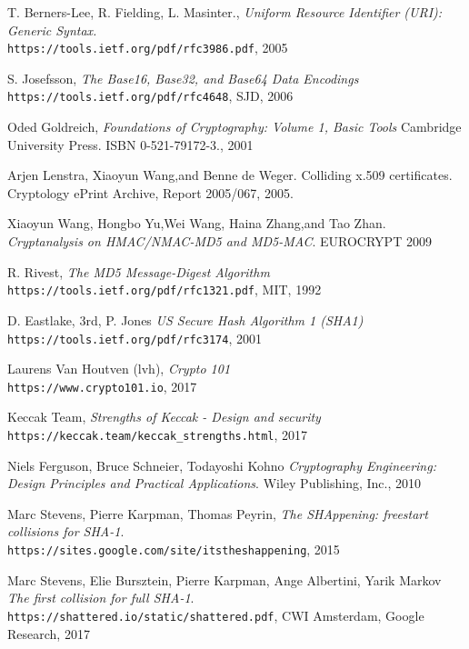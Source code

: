 \begin{thebibliography}{9}

T. Berners-Lee, R. Fielding, L. Masinter.,
\textit{Uniform Resource Identifier (URI): Generic Syntax.} \\ 
\texttt{https://tools.ietf.org/pdf/rfc3986.pdf}, 2005

S. Josefsson,
\textit{The Base16, Base32, and Base64 Data Encodings} \\ 
\texttt{https://tools.ietf.org/pdf/rfc4648}, SJD, 2006

Oded Goldreich,
\textit{Foundations of Cryptography: Volume 1, Basic Tools}  
Cambridge University Press. ISBN 0-521-79172-3., 2001

Arjen Lenstra, Xiaoyun Wang,and Benne de Weger. Colliding
x.509 certificates. Cryptology ePrint Archive, Report 2005/067,
2005.

Xiaoyun Wang, Hongbo Yu,Wei Wang, Haina Zhang,and Tao Zhan. 
\textit{Cryptanalysis on HMAC/NMAC-MD5 and MD5-MAC}. EUROCRYPT 2009

R. Rivest,
\textit{The MD5 Message-Digest Algorithm} \\ 
\texttt{https://tools.ietf.org/pdf/rfc1321.pdf}, MIT, 1992

D. Eastlake, 3rd, P. Jones
\textit{US Secure Hash Algorithm 1 (SHA1)} \\ 
\texttt{https://tools.ietf.org/pdf/rfc3174}, 2001

Laurens Van Houtven (lvh),
\textit{Crypto 101} \\ 
\texttt{https://www.crypto101.io}, 2017

Keccak Team,
\textit{Strengths of Keccak - Design and security} \\ 
\texttt{https://keccak.team/keccak\_strengths.html}, 2017

Niels Ferguson, Bruce Schneier, Todayoshi Kohno
\textit{Cryptography Engineering: Design Principles and Practical Applications}. Wiley Publishing, Inc., 2010

Marc Stevens, Pierre Karpman, Thomas Peyrin,
\textit{The SHAppening: freestart collisions for SHA-1}. \\
\texttt{https://sites.google.com/site/itstheshappening}, 2015

Marc Stevens, Elie Bursztein, Pierre Karpman, Ange Albertini, Yarik Markov
\textit{The first collision for full SHA-1}. \\
\texttt{https://shattered.io/static/shattered.pdf}, CWI Amsterdam, Google Research, 2017


\end{thebibliography}
